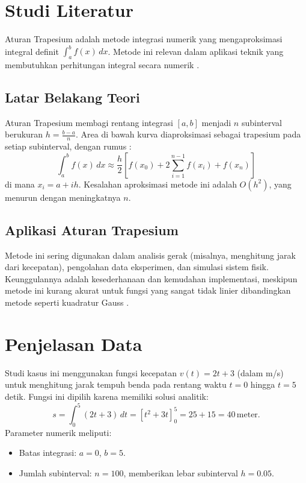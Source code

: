 \documentclass[conference]{IEEEtran}
\begin{document}
\section{Studi Literatur}
Aturan Trapesium adalah metode integrasi numerik yang mengaproksimasi integral definit \( \int_a^b f(x) \, dx \). Metode ini relevan dalam aplikasi teknik yang membutuhkan perhitungan integral secara numerik \cite{b1}.

\subsection{Latar Belakang Teori}
Aturan Trapesium membagi rentang integrasi \([a, b]\) menjadi \( n \) subinterval berukuran \( h = \frac{b-a}{n} \). Area di bawah kurva diaproksimasi sebagai trapesium pada setiap subinterval, dengan rumus \cite{b1}:
\begin{equation}
\int_a^b f(x) \, dx \approx \frac{h}{2} \left[ f(x_0) + 2 \sum_{i=1}^{n-1} f(x_i) + f(x_n) \right]
\label{eq:trapezoidal}
\end{equation}
di mana \( x_i = a + i h \). Kesalahan aproksimasi metode ini adalah \( O(h^2) \), yang menurun dengan meningkatnya \( n \).

\subsection{Aplikasi Aturan Trapesium}
Metode ini sering digunakan dalam analisis gerak (misalnya, menghitung jarak dari kecepatan), pengolahan data eksperimen, dan simulasi sistem fisik. Keunggulannya adalah kesederhanaan dan kemudahan implementasi, meskipun metode ini kurang akurat untuk fungsi yang sangat tidak linier dibandingkan metode seperti kuadratur Gauss \cite{b1}.

\section{Penjelasan Data}
Studi kasus ini menggunakan fungsi kecepatan \( v(t) = 2t + 3 \) (dalam m/s) untuk menghitung jarak tempuh benda pada rentang waktu \( t = 0 \) hingga \( t = 5 \) detik. Fungsi ini dipilih karena memiliki solusi analitik:
\begin{equation}
s = \int_0^5 (2t + 3) \, dt = \left[ t^2 + 3t \right]_0^5 = 25 + 15 = 40 \, \text{meter}.
\label{eq:analytic}
\end{equation}
Parameter numerik meliputi:
\begin{itemize}
    \item Batas integrasi: \( a = 0 \), \( b = 5 \).
    \item Jumlah subinterval: \( n = 100 \), memberikan lebar subinterval \( h = 0.05 \).
\end{itemize}
\end{document}
